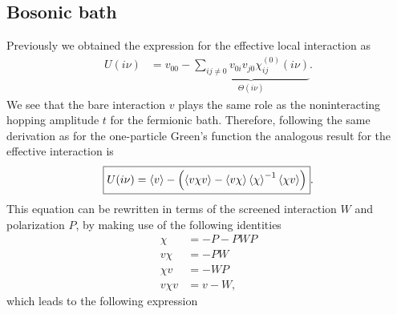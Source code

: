 \documentclass[12pt,a4paper]{scrartcl}
\numberwithin{equation}{section}
\begin{document}
\subsection{Bosonic bath}
Previously we obtained the expression for the effective local interaction as 
\begin{align}
 U(i\nu) 
 &= v_{00} - \underbrace{\sum_{ij\neq 0} v_{0i} v_{j0} \chi^{(0)}_{ij}(i\nu)}_{\Theta(i\nu)}.
\end{align}
We see that the bare interaction $v$ plays the same role as the noninteracting hopping amplitude $t$ for the fermionic bath.
Therefore, following the same derivation as for the one-particle Green's function the analogous result
for the effective interaction is 
\begin{align}
\boxed{
 U(i\nu) 
 = \braket{v} - \left( \braket{ v \chi v } - \braket{v \chi} \braket{\chi}^{-1} \braket{\chi v} \right)
 }. \label{eq:eff_dyson_for_interaction}
\end{align}
This equation  can be rewritten in terms of the screened interaction $W$ and polarization $P$,
by making use of the following identities
\begin{align}
 \chi &= - P -PWP \\
 v \chi &= -PW \\
 \chi v &= -WP \\
 v\chi v &= v - W,
\end{align}
which leads to the following expression
\end{document}

